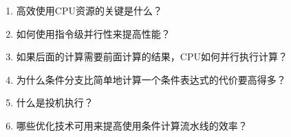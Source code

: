 \begin{enumerate}
\item 高效使用CPU资源的关键是什么？
\item 如何使用指令级并行性来提高性能？
\item 如果后面的计算需要前面计算的结果，CPU如何并行执行计算？
\item 为什么条件分支比简单地计算一个条件表达式的代价要高得多？
\item 什么是投机执行？
\item 哪些优化技术可用来提高使用条件计算流水线的效率？
\end{enumerate}